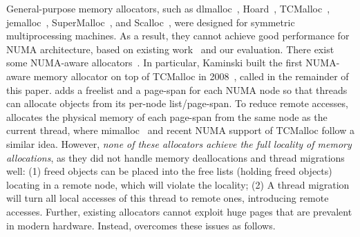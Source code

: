 
General-purpose memory allocators, such as dlmalloc~\cite{dlmalloc},  Hoard~\cite{Hoard}, TCMalloc~\cite{tcmalloc}, jemalloc~\cite{jemalloc}, SuperMalloc~\cite{supermalloc}, and  Scalloc~\cite{Scalloc}, were designed for symmetric multiprocessing machines. As a result, they cannot achieve good performance for NUMA architecture, based on existing work~\cite{tcmallocnew, yang2019jarena} and our evaluation. There exist some NUMA-aware allocators~\cite{tcmallocnew, tcmalloc2, kim2013node, yang2019jarena, mimalloc}. In particular, Kaminski built the first NUMA-aware memory allocator on top of TCMalloc in 2008~\cite{tcmallocnew}, called \TN{} in the remainder of this paper. \TN{} adds a freelist  and a page-span for each NUMA node so that threads can allocate objects from its per-node list/page-span. To reduce remote accesses, \TN{} allocates the physical memory of each page-span from the same node as the current thread, where mimalloc~\cite{mimalloc} and recent NUMA support of TCMalloc follow a similar idea.  However, \textit{none of these allocators achieve the full locality of memory allocations}, as they did not handle memory deallocations and thread migrations well: (1)  freed objects can be   placed into the free lists (holding freed objects) locating in a remote node, 
which will violate the locality;
(2) A thread migration will turn all local accesses of this thread to remote ones, introducing  remote accesses. Further, existing allocators cannot exploit huge pages that are prevalent in modern hardware. Instead, \NM{} overcomes these issues as follows. 

